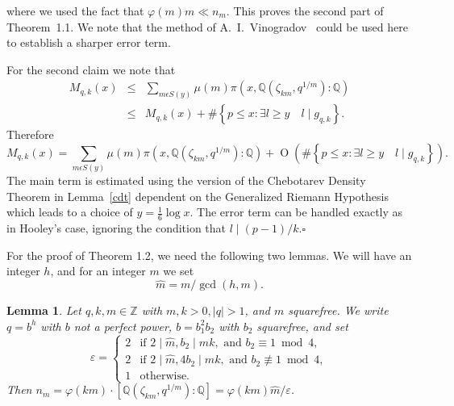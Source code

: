 \documentclass[twoside,final,reqno,noamsfonts]{birkartspecial}
\newtheorem{lemma}[theorem]{Lemma}
\begin{document}
\noindent where we used the fact that $\varphi(m)m\ll n_m$. This proves the second part of
 Theorem~1.1. We note that the
method of A.~I.~Vinogradov~\cite{V} could be used here to establish a sharper error term.

For the second claim we note that
\begin{eqnarray*}
M_{q,k}(x) & \leq &\sum_{m \epsilon S (y)}
\mu(m)\pi(x,{\mathbb Q}(\zeta_{km},q^{1/m})\colon{\mathbb Q})\\
 & \leq & M_{q,k}(x)+\#\left\{p\leq x\colon \exists l\geq y
\quad l \mid g_{q,k}\right\}.
\end{eqnarray*}
Therefore
$$ M_{q,k}(x) =\sum_{m \epsilon S (y)}
\mu(m)\pi(x,{\mathbb Q}(\zeta_{km},q^{1/m}):{\mathbb Q})
+\operatorname{O}\left(\#\left\{p\leq x\colon\exists l\geq y \quad l \mid g_{q,k}
\right\}\right).$$
The main term is estimated using the version of the Chebotarev Density Theorem in Lemma~\ref{cdt}
dependent on the Generalized Riemann Hypothesis which leads to a choice of $y=\frac{1}{6}\log x$.
The error term can be handled exactly as in Hooley's case, ignoring the
condition that $l\mid (p-1)/k$.\null\hfill$\square$\par\medbreak

\removelastskip\par\medskip
\noindent For the proof of Theorem 1.2,
we need the following two lemmas. We will have an integer $h$, and
for an integer $m$ we set
$$
\hat{m}=m/ \gcd (h,m).
$$
\begin{lemma}\label{density1} Let $q,k,m\in{\mathbb Z}$ with $m,k>0, |q|>1$,
and $m$ squarefree. We write
$q=b^h$ with $b$ not a perfect power, $b=b_1^2b_2$ with $b_2$
squarefree, and set
$$\varepsilon=\begin{cases}
2 &  \text{if\ } 2\mid\hat{m}, b_2\mid m k,\text{ and }b_2\equiv 1 \bmod4, \\
2 &  \text{if\ } 2\mid\hat{m}, 4b_2\mid m k,\text{ and } b_2\not\equiv
 1 \bmod 4,\\
1 &  \text{otherwise.}
\end{cases}$$
Then $n_m=\varphi(km)\cdot\left[{\mathbb Q}(\zeta_{km},q^{1/m}):{\mathbb Q}
\right]=\varphi(km)\hat{m}/\varepsilon$.
\end{lemma}
\end{document}
